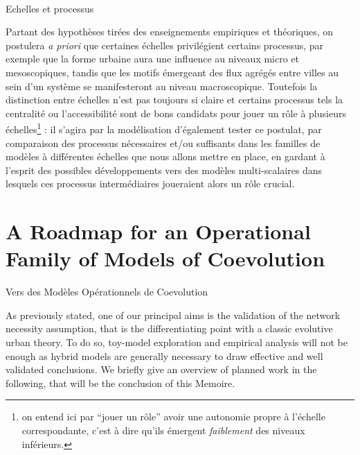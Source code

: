 \paragraph{}{Echelles et processus}

Partant des hypothèses tirées des enseignements empiriques et théoriques, on postulera \emph{a priori} que certaines échelles privilégient certains processus, par exemple que la forme urbaine aura une influence au niveaux micro et mesoscopiques, tandis que les motifs émergeant des flux agrégés entre villes au sein d'un système se manifesteront au niveau macroscopique. Toutefois la distinction entre échelles n'est pas toujours si claire et certains processus tels la centralité ou l'accessibilité sont de bons candidats pour jouer un rôle à plusieurs échelles\footnote{on entend ici par ``jouer un rôle'' avoir une autonomie propre à l'échelle correspondante, c'est à dire qu'ils émergent \emph{faiblement}  des niveaux inférieurs.}%
 : il s'agira par la modélisation d'également tester ce postulat, par comparaison des processus nécessaires et/ou suffisants dans les familles de modèles à différentes échelles que nous allons mettre en place, en gardant à l'esprit des possibles développements vers des modèles multi-scalaires dans lesquels ces processus intermédiaires joueraient alors un rôle crucial. %









\section*{A Roadmap for an Operational Family of Models of Coevolution}{Vers des Modèles Opérationnels de Coevolution} %

\label{ch:operational}


As previously stated, one of our principal aims is the validation of the network necessity assumption, that is the differentiating point with a classic evolutive urban theory. To do so, toy-model exploration and empirical analysis will not be enough as hybrid models are generally necessary to draw effective and well validated conclusions. We briefly give an overview of planned work in the following, that will be the conclusion of this Memoire.



